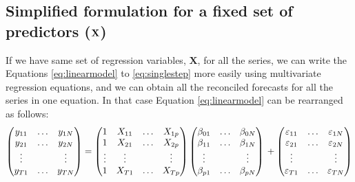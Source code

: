 \documentclass[11pt,a4paper,]{article}
\begin{document}
\hypertarget{simplified-formulation-for-a-fixed-set-of-predictors-bf-x}{%
\subsection{\texorpdfstring{Simplified formulation for a fixed set of
predictors (\(\bf {X}\))
\label{sec:proposedapproach2}}{Simplified formulation for a fixed set of predictors (\textbackslash{}bf \{X\}) }}\label{simplified-formulation-for-a-fixed-set-of-predictors-bf-x}}

If we have same set of regression variables, \(\bm{X}\), for all the
series, we can write the Equations \eqref{eq:linearmodel} to
\eqref{eq:singlestep} more easily using multivariate regression equations,
and we can obtain all the reconciled forecasts for all the series in one
equation. In that case Equation \eqref{eq:linearmodel} can be rearranged
as follows: \begin{equation}\label{eq:linearmodelsameX}
  \begin{pmatrix}
  y_{11} & \dots & y_{1N}\\
  y_{21} & \dots & y_{2N}\\
  \vdots &       & \vdots\\
  y_{T1} & \dots & y_{TN}
  \end{pmatrix} =
  \begin{pmatrix}
  1      & X_{11} & \dots & X_{1p}\\
  1      & X_{21} & \dots & X_{2p}\\
  \vdots & \vdots &       & \vdots\\
  1      & X_{T1} & \dots & X_{Tp}
  \end{pmatrix}
  \begin{pmatrix}
  \beta_{01} & \dots & \beta_{0N}\\
  \beta_{11} & \dots & \beta_{1N}\\
  \vdots     &       & \vdots\\
  \beta_{p1} & \dots & \beta_{pN}
  \end{pmatrix} \\
  +
  \begin{pmatrix}
  \varepsilon_{11} & \dots & \varepsilon_{1N}\\
  \varepsilon_{21} & \dots & \varepsilon_{2N}\\
  \vdots           &       & \vdots\\
  \varepsilon_{T1} & \dots & \varepsilon_{TN}
  \end{pmatrix}
\end{equation}
\end{document}
